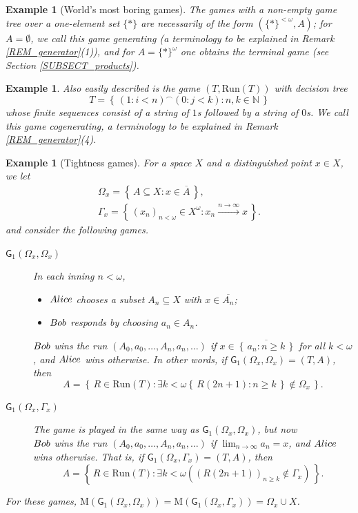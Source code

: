 \documentclass[12pt]{amsart}
\newtheorem{ex}[thm]{Example}
\theoremstyle{definition}
\newcommand{\set}[1]{\left\{\, {#1} \,\right\}}
\newcommand{\seq}[1]{{\left( {#1} \right)}}
\newcommand{\W}{{\Omega}}
\newcommand{\g}{\mathsf{G}}
\newcommand{\ali}{\textup{\textmd{\textsc{Alice}}}}
\newcommand{\bob}{\textup{\textmd{\textsc{Bob}}}}
\newcommand{\Run}{{\mathrm{Run}}}
\newcommand{\M}{\mathrm{M}}
\newcommand{\NN}{\mathbb{N}}
\begin{document}
\begin{ex}[World's most boring games]\label{EX_boring}
	The games with a non-empty game tree over a one-element set $\{*\}$ are necessarily of the form $(\{*\}^{<\omega},A)$; for $A=\emptyset$, we call this game {\em generating} (a terminology to be explained in {\em Remark \ref{REM_generator}(1)}), and  for $A=\{*\}^{\omega}$ one obtains the {\em terminal game} (see {\rm Section \ref{SUBSECT_products}}). 
\end{ex}


\begin{ex}\label{EX_cogen}
	Also easily described is the game $(T,\Run(T))$ with decision tree
	\[
	T = \set{\seq{1:i<n}^\smallfrown \seq{0:j<k}:n,k\in\NN}
	\]
	whose finite sequences consist of a string of $1$s followed by a string of $0$s. 
	We call this game {\em cogenerating}, a terminology to be explained in {\em Remark \ref{REM_generator}(4)}.
\end{ex}


\begin{ex}[Tightness games]\label{EX_Tightness}
	For a space $X$ and a distinguished point $x\in X$, we let 
	\begin{gather*}
		\W_x=\set{A\subseteq X: x\in\overline{A}},\\
		\Gamma_x = \set{(x_n)_{n<\omega}\in X^\omega: x_n\stackrel{n\to\infty}{\longrightarrow}x}.
	\end{gather*}
	and consider the following games.
	\begin{description}
		\item[$\g_1(\W_x,\W_x)$] In each inning $n<\omega$,
		\begin{itemize}
			\item $\ali$ chooses a subset $A_n\subseteq X$ with $x\in \overline{A_n}$;
			\item $\bob$ responds by choosing $a_n\in A_n$.
		\end{itemize} 
		$\bob$ wins the run $\seq{A_0,a_0,\dotsc, A_n,a_n,\dotsc}$ if $x\in \overline{\set{a_n:n\ge k}}$ for all $k<\omega$, and $\ali$ wins otherwise. In other words, if $\g_1(\W_x,\W_x) = (T,A)$, then 
		\[
		A = \set{R\in \Run(T): \exists k<\omega \set{R(2n+1):n\ge k}\notin \W_x}.
		\]
		
		\item[$\g_1(\W_x,\Gamma_x)$] The game is played in the same way as $\g_1(\W_x,\W_x)$, but now\\
		$\bob$ wins the run $\seq{A_0,a_0,\dotsc, A_n,a_n,\dotsc}$ if $\lim_{n\to\infty}a_n=x$, and $\ali$ wins otherwise. That is, if $\g_1(\W_x,\Gamma_x) = (T,A)$, then 
		\[
		A = \set{R\in \Run(T): \exists k<\omega \left((R(2n+1))_{n\ge k}\notin \Gamma_x\right)}.
		\]
	\end{description}
	For these games, $\M(\g_1(\W_x,\W_x)) = \M(\g_1(\W_x,\Gamma_x))=\W_x\cup X$.	
\end{ex}
\end{document}
